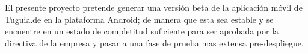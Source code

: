 El presente proyecto pretende generar una versión beta de la aplicación móvil de Tuguia.de en la plataforma Android; de manera que esta sea estable y se encuentre en un estado de completitud suficiente para ser aprobada por la directiva de la empresa y pasar a una fase de prueba mas extensa pre-despliegue. 